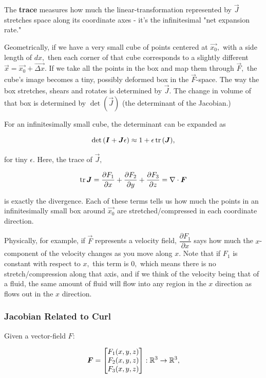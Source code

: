 \documentclass{article}
\begin{document}
The \textbf{trace} measures how much the \@{linear-transformation} represented by $\vec{J}$ stretches space along its coordinate axes - it's the infinitesimal "net expansion rate."

Geometrically, if we have a very small cube of points centered at $\vec{x_0},$ with a side length of $dx,$ then each corner of that cube corresponds to a slightly different $\vec{x} = \vec{x_0} + \vec{\Delta x}.$ If we take all the points in the box and map them through $\vec{F},$ the cube's image becomes a tiny, possibly deformed box in the $\vec{F}$-space. The way the box stretches, shears and rotates is determined by $\vec{J}.$ The change in volume of that box is determined by $\det{(\vec{J})}$ (the determinant of the \@{Jacobian}.)

For an infinitesimally small cube, the \@{determinant} can be expanded as

\[ \det{(\boldsymbol{I} + \boldsymbol{J} \epsilon)} \approx 1 + \epsilon \operatorname{tr}{(}\boldsymbol{J}), \]

for tiny $\epsilon.$ Here, the \@{trace} of $\vec{J},$

\[ \operatorname{tr}{\boldsymbol{J}} = \dfrac{\partial F_1}{\partial x} +  \dfrac{\partial F_2}{\partial y} + \dfrac{\partial F_3}{\partial z} = \nabla \cdot \boldsymbol{F} \]

is exactly the \@{divergence}. Each of these terms tells us how much the points in an infinitesimally small box around $\vec{x_0}$ are stretched/compressed in each coordinate direction.

Physically, for example, if $\vec{F}$ represents a velocity field, $\dfrac{\partial F_1}{\partial x}$ says how much the $x$-component of the velocity changes as you move along $x.$ Note that if $F_1$ is constant with respect to $x,$ this term is $0,$ which means there is no stretch/compression along that axis, and if we think of the velocity being that of a fluid, the same amount of fluid will flow into any region in the $x$ direction as flows out in the $x$ direction.

\subsubsection{Jacobian Related to Curl}

Given a \@{vector-field} $F:$

\[ \boldsymbol{F} = \begin{bmatrix}
  F_1(x,y,z) \\  
  F_2(x,y,z) \\
  F_3(x,y,z) \\   
\end{bmatrix} : \mathbb{R}^3 \to \mathbb{R}^3, \]
\end{document}
